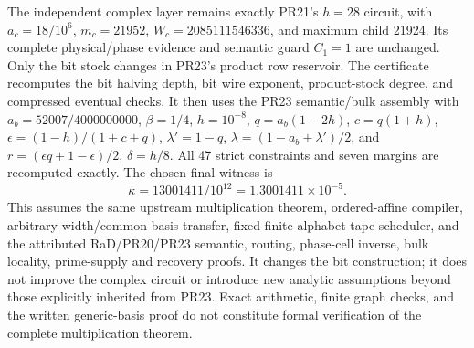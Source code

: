 The independent complex layer remains exactly PR21's $h=28$ circuit,
with $a_c=18/10^6$, $m_c=21952$, $W_c=2085111546336$, and maximum child
21924. Its complete physical/phase evidence and semantic guard $C_1=1$
are unchanged. Only the bit stock changes in PR23's product row reservoir.
The certificate recomputes the bit halving depth, bit wire exponent,
product-stock degree, and compressed eventual checks. It then uses the
PR23 semantic/bulk assembly with $a_b=52007/4000000000$, $\beta=1/4$,
$h=10^{-8}$, $q=a_b(1-2h)$, $c=q(1+h)$,
$\epsilon=(1-h)/(1+c+q)$, $\lambda'=1-q$,
$\lambda=(1-a_b+\lambda')/2$, and
$r=(\epsilon q+1-\epsilon)/2$, $\delta=h/8$.
All 47 strict constraints and seven margins are recomputed exactly.
The chosen final witness is
\[
 \boxed{\kappa=13001411/10^{12}=1.3001411\times10^{-5}}.
\]
This assumes the same upstream multiplication theorem, ordered-affine
compiler, arbitrary-width/common-basis transfer, fixed finite-alphabet tape
scheduler, and the attributed RaD/PR20/PR23 semantic, routing, phase-cell
inverse, bulk locality, prime-supply and recovery proofs. It changes the
bit construction; it does not improve the complex circuit or introduce
new analytic assumptions beyond those explicitly inherited from PR23.
Exact arithmetic, finite graph checks, and the written generic-basis proof
do not constitute formal verification of the complete multiplication theorem.
